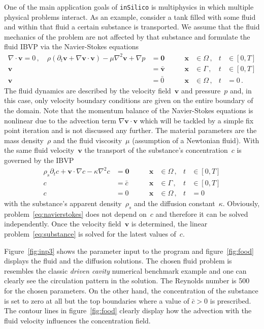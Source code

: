 \documentclass[a4paper,DIV=12,10pt]{scrartcl}
\newcommand{\vek}[1]{\boldsymbol{#1}}  %
\newcommand{\x}[0]{\vek{x}}
\newcommand{\V}[0]{\vek{v}}
\newcommand{\IS}[0]{\texttt{inSilico}}
\begin{document}
One of the main application goals of \IS{} is multiphysics in which
multiple physical problems interact. As an example, consider a tank
filled with some fluid and within that fluid a certain substance is
transported. We assume that the fluid mechanics of the problem are not
affected by that substance and formulate the fluid IBVP via the
Navier-Stokes equations
\begin{equation}
  \label{eq:navierstokes}
  \begin{aligned}
    \nabla \cdot \V = 0\,, \quad \rho (\partial_t \V + \nabla \V
    \cdot \V) - \mu \nabla^2 \V + \nabla p &= \vek{0} \qquad
    &\x &\in \Omega\,, &t &\in [0,T]\\
    \V &= \bar{\V} &\x &\in \Gamma\,, &t &\in [0,T]\\
    \V &= \bar{0}  &\x &\in \Omega\,, &t &= 0\,.
  \end{aligned}
\end{equation}
The fluid dynamics are described by the velocity field~$\V$ and
pressure~$p$ and, in this case, only velocity boundary conditions are
given on the entire boundary of the domain. Note that the momentum
balance of the Navier-Stokes equations is nonlinear due to the
advection term $\nabla \V \cdot \V$ which will be tackled by a simple
fix point iteration and is not discussed any further. The material
parameters are the mass density~$\rho$ and the fluid viscosity~$\mu$
(assumption of a Newtonian fluid). With the same fluid velocity~$\V$
the transport of the substance's concentration~$c$ is governed by the
IBVP
\begin{equation}
  \label{eq:substance}
  \begin{aligned}
    \rho_s \partial_t c + \V \cdot \nabla c -
    \kappa  \nabla^2 c &= \vek{0} \qquad
    &\x &\in \Omega\,, &t &\in [0,T]\\
    c &= \bar{c} &\x &\in \Gamma\,, &t &\in [0,T]\\
    c &= 0  &\x &\in \Omega\,, &t &= 0
  \end{aligned}
\end{equation}
with the substance's apparent density~$\rho_s$ and the diffusion
constant~$\kappa$. Obviously, problem~\eqref{eq:navierstokes} does not
depend on~$c$ and therefore it can be solved independently. Once the
velocity field~$\V$ is determined, the linear
problem~\eqref{eq:substance} is solved for the latest values of~$c$.

Figure~\ref{fig:inp3} shows the parameter input to the program and
figure~\ref{fig:food} displays the fluid and the diffusion
solutions. The chosen fluid problem is resembles the classic
\emph{driven cavity} numerical benchmark example and one can clearly
see the circulation pattern in the solution. The Reynolds number is
500 for the chosen parameters. On the other hand, the concentration of
the substance is set to zero at all but the top boundaries where a
value of $\bar{c} > 0$ is prescribed. The contour lines in
figure~\ref{fig:food} clearly display how the advection with the fluid
velocity influences the concentration field.
\end{document}
